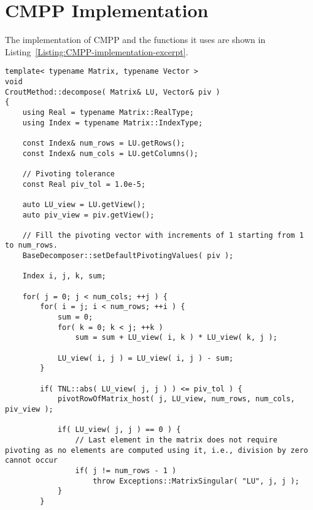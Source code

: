 \newpage 									%
\appendix

\chapter{CMPP Implementation}\label{Appendix:CMPP-implementation}
The implementation of CMPP and the functions it uses are shown in Listing~\ref{Listing:CMPP-implementation-excerpt}.

\begin{lstlisting}[caption={Excerpt from the implementation of CMPP. The \code{pivotRowOfMatrix\_host()} function, presented below the \code{decompose()} method, is implemented in the parent class of \code{CroutMethod}: \code{BaseDecomposer}. Note that the code has been slightly modified for brevity. For example, the \code{swapRows\_host()} function has been omitted as it is a basic operation, and the checks for appropriate sizing of matrices/vectors have been removed.},label={Listing:CMPP-implementation-excerpt}]
template< typename Matrix, typename Vector >
void
CroutMethod::decompose( Matrix& LU, Vector& piv )
{
	using Real = typename Matrix::RealType;
	using Index = typename Matrix::IndexType;
	
	const Index& num_rows = LU.getRows();
	const Index& num_cols = LU.getColumns();
	
	// Pivoting tolerance
	const Real piv_tol = 1.0e-5;
	
	auto LU_view = LU.getView();
	auto piv_view = piv.getView();
	
	// Fill the pivoting vector with increments of 1 starting from 1 to num_rows.
	BaseDecomposer::setDefaultPivotingValues( piv );
	
	Index i, j, k, sum;
	
	for( j = 0; j < num_cols; ++j ) {
		for( i = j; i < num_rows; ++i ) {
			sum = 0;
			for( k = 0; k < j; ++k )
				sum = sum + LU_view( i, k ) * LU_view( k, j );
			
			LU_view( i, j ) = LU_view( i, j ) - sum;
		}
		
		if( TNL::abs( LU_view( j, j ) ) <= piv_tol ) {
			pivotRowOfMatrix_host( j, LU_view, num_rows, num_cols, piv_view );
			
			if( LU_view( j, j ) == 0 ) {
				// Last element in the matrix does not require pivoting as no elements are computed using it, i.e., division by zero cannot occur
				if( j != num_rows - 1 )
					throw Exceptions::MatrixSingular( "LU", j, j );
			}
		}
		

\end{lstlisting}
